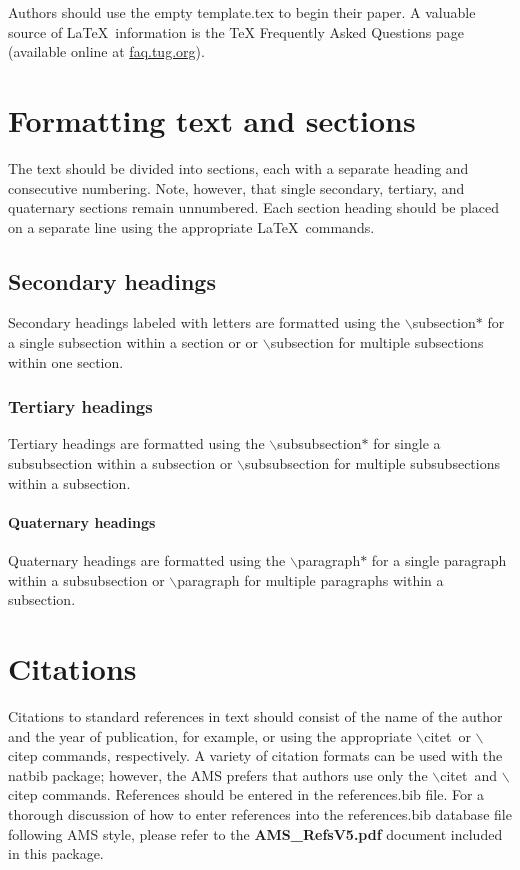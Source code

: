 \documentclass{ametsocV5}
\begin{document}
Authors should use the empty template.tex to begin their
paper. A valuable source of \LaTeX\ information is the {TeX
Frequently Asked Questions} page (available online at \url{faq.tug.org}).

\section{Formatting text and sections}
The text should be divided into sections, each with a separate heading and
consecutive numbering. Note, however, that single secondary, tertiary, and
quaternary sections remain unnumbered. Each section heading should be placed
on a separate line using the appropriate \LaTeX\ commands. 

\subsection*{Secondary headings} 
Secondary headings labeled with letters are formatted using the
$\backslash$subsection$*${\tt\string{\string}} for a single
subsection within a section or
or $\backslash$subsection{\tt\string{\string}} 
for multiple
subsections within one section.

\subsubsection*{Tertiary headings} 
Tertiary headings are formatted using the
$\backslash$subsubsection$*${\tt\string{\string}} for single a subsubsection
within a subsection or
$\backslash$subsubsection{\tt\string{\string}} 
for multiple subsubsections
within a subsection. 

\paragraph*{Quaternary headings} 
Quaternary headings are formatted using the
$\backslash$paragraph$*${\tt\string{\string}} for a single paragraph within
a subsubsection or
$\backslash$paragraph{\tt\string{\string}} 
for multiple paragraphs
within a subsection.

\section{Citations}
Citations to standard references in text should consist of the name of the
author and the year of publication, for example, \citet{Becker+Schmitz2003} or
\citep{Becker+Schmitz2003} using the appropriate $\backslash$citet\ or
$\backslash$citep commands, respectively. A variety of citation formats can
be used with the natbib package; however, the AMS prefers that authors use only the $\backslash$citet\ and
$\backslash$citep commands. References should be entered in the references.bib file. For a thorough
discussion of how to enter references into the references.bib database file
following AMS style, please refer to the \textbf{AMS\_RefsV5.pdf} document
included in this package.
\end{document}
